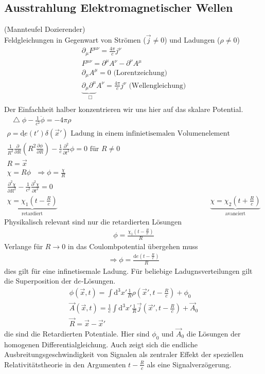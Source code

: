 \documentclass[a4paper]{article}
\newcommand*\laplace{\mathop{}\!\mathbin\bigtriangleup}
\newcommand*\dalembert{\mathop{}\!\mathbin\Box}
\begin{document}
\subsection{Ausstrahlung Elektromagnetischer Wellen}
(Mannteufel Dozierender)\\
Feldgleichungen in Gegenwart von Strömen ($\vec{j}\neq0$) und Ladungen
($\rho\neq0$)\\
\begin{align}
\partial_\mu F^{\mu\nu}=\frac{4\pi}{c}j^\nu\\
F^{\mu\nu}=\partial^\mu A^\nu-\partial^\nu A^\mu\\
\partial_\mu A^\mu=0 \text{ (Lorentzeichung)}\\
\underbrace{\partial_\mu \partial^\mu}_{\dalembert} A^\nu=\frac{4\pi}{c}j^\nu
\text{ (Wellengleichung)}\\
\end{align}
Der Einfachheit halber konzentrieren wir uns hier auf das skalare Potential.
\begin{align}
\laplace\phi-\frac{1}{c^2}\ddot{\phi}=-4\pi\rho\\
\rho=\underline{\mathrm{d}e}(t')\delta(\vec{x}') \text{ Ladung in einem infinietisemalen
Volumenelement}\\
\frac{1}{R^2}\frac{\partial}{\partial R} \left( R^2 \frac{\partial\phi}{\partial
R}\right)-\frac{1}{c}\frac{\partial^2}{\partial t^2}\phi=0 \text{ für }R\neq0\\
R=\vec{x}\\
\chi=R\phi \text{  }\Rightarrow \phi=\frac{\chi}{R}\\
\frac{\partial^2\chi}{\partial R^2}-\frac{1}{c^2}\frac{\partial^2\chi}{\partial
t^2}=0\\
\underbrace{\chi=\chi_1(t-\frac{R}{c})}_{\text{retardiert}} &
\underbrace{\chi=\chi_2(t+\frac{R}{c})}_{\text{avanciert}}
\end{align}
Physikalisch relevant sind nur die retardierten Lösungen
\begin{align}
\phi=\frac{\chi_1(t-\frac{R}{c})}{R}
\end{align}
Verlange für $R\rightarrow0$ in das Coulombpotential übergehen muss\\
\begin{align}
\Rightarrow \phi=\frac{\mathrm{d}e\left(t-\frac{R}{c}\right)}{R}
\end{align}
dies gilt für eine infinetisemale Ladung. Für beliebige Ladugnsverteilungen gilt
die Superposition der $\mathrm{d}e$-Lösungen.
\begin{align}
\phi(\vec{x},t)=\int \mathrm{d}^3x'
\frac{1}{R}\rho\left(\vec{x}',t-\frac{R}{c}\right)+\phi_0\\
\vec{A}(\vec{x},t)=\frac{1}{c}\int
\mathrm{d}^3x'\frac{1}{R}\vec{j}\left(\vec{x}',t-\frac{R}{c}\right)+\vec{A}_0\\
\vec{R}=\vec{x}-\vec{x}'
\end{align}
die sind die Retardierten Potentiale. Hier sind $\phi_0$ und $\vec{A}_0$ die
Lösungen der homogenen Differentialgleichung. Auch zeigt sich die endliche
Ausbreitungsgeschwindigkeit von Signalen als zentraler Effekt der speziellen
Relativitätstheorie in den Argumenten $t-\frac{R}{c}$ als eine
Signalverzögerung.
\end{document}
